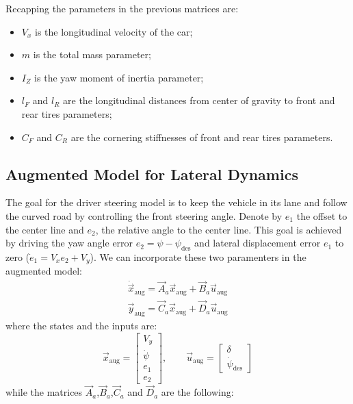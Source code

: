 Recapping the parameters in the previous matrices are:
\begin{itemize}
	\item $V_x$ is the longitudinal velocity of the car;	
	\item $m$ is the total mass parameter; 
	\item $I_Z$ is the yaw moment of inertia parameter;
	\item $l_F$ and $l_R$ are the longitudinal distances from center of gravity to front and rear tires parameters;
	\item $C_F$ and $C_R$ are the cornering stiffnesses of front and rear tires parameters.
\end{itemize}
\subsection{Augmented Model for Lateral Dynamics}
The goal for the driver steering model is to keep the vehicle in its lane and follow the curved road by controlling the front steering angle. Denote by $e_1$ the offset to the center line and $e_2$, the relative angle to the center line. This goal is achieved by driving the yaw angle error $e_2 = \psi -\psi_{\text{des}}$ and lateral displacement error $e_1$ to zero ($\dot{e}_1 = V_xe_2+V_y$). We can incorporate these two paramenters in the augmented model:
\begin{equation}
\label{eqn:lateral_dynamics_augmented_model}
\begin{array}{ll}
\dot{\vec{x}}_{\text{aug}} =\vec{A}_a \vec{x}_{\text{aug}}+ \vec{B}_a \vec{u}_{\text{aug}}\\
\vec{y}_{\text{aug}} = \vec{C}_a \vec{x}_{\text{aug}} + \vec{D}_a \vec{u}_{\text{aug}}
\end{array}
\end{equation}
where the states and the inputs are:
\begin{equation}
\vec{x}_{\text{aug}} = \begin{bmatrix}
V_y\\\dot{\psi}\\e_1\\e_2
\end{bmatrix},
\qquad
\vec{u}_{\text{aug}} = 
\begin{bmatrix}
\delta\\\dot{\psi}_{\text{des}}
\end{bmatrix}
\end{equation}
while the matrices $\vec{A}_a$,$\vec{B}_a$,$\vec{C}_a$ and $\vec{D}_a$ are the following:
